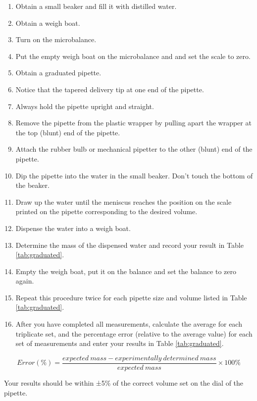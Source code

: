 \documentclass[]{book}
\providecommand{\tightlist}{%
  \setlength{\itemsep}{0pt}\setlength{\parskip}{0pt}}
\begin{document}
\begin{enumerate}
\def\labelenumi{\arabic{enumi}.}
\tightlist
\item
  Obtain a small beaker and fill it with distilled water.
\item
  Obtain a weigh boat.
\item
  Turn on the microbalance.
\item
  Put the empty weigh boat on the microbalance and and set the scale to
  zero.
\item
  Obtain a graduated pipette.
\item
  Notice that the tapered delivery tip at one end of the pipette.
\item
  Always hold the pipette upright and straight.
\item
  Remove the pipette from the plastic wrapper by pulling apart the
  wrapper at the top (blunt) end of the pipette.
\item
  Attach the rubber bulb or mechanical pipetter to the other (blunt) end
  of the pipette.
\item
  Dip the pipette into the water in the small beaker. Don't touch the
  bottom of the beaker.
\item
  Draw up the water until the meniscus reaches the position on the scale
  printed on the pipette corresponding to the desired volume.
\item
  Dispense the water into a weigh boat.
\item
  Determine the mass of the dispensed water and record your result in
  Table \ref{tab:graduated}.
\item
  Empty the weigh boat, put it on the balance and set the balance to
  zero again.
\item
  Repeat this procedure twice for each pipette size and volume listed in
  Table \ref{tab:graduated}.
\item
  After you have completed all measurements, calculate the average for
  each triplicate set, and the percentage error (relative to the average
  value) for each set of measurements and enter your results in Table
  \ref{tab:graduated}.
\end{enumerate}

\[ Error (\%) = \frac{expected\ mass - experimentally\ determined\ mass}{expected\ mass} \times 100\% \]

Your results should be within ±5\% of the correct volume set on the dial
of the pipette.
\end{document}
